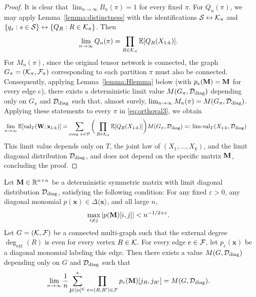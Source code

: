 \documentclass[10pt,reqno]{amsart}
\def\x{\mathbf{x}}
\def\E{\mathbb{E}}
\def\R{\mathbb{R}}
\def\val{\operatorname{val}}
\def\limval{\operatorname{lim-val}}
\def\bW{{\mathbf{W}}}
\def\eps{\varepsilon}
\newcommand{\degext}{\deg_\mathrm{ext}}
\newcommand{\tdiag}{\mathrm{diag}}
\begin{document}
\begin{proof}
It is clear that $\lim_{n \to \infty} B_n(\pi)=1$ for every fixed $\pi$.
For $Q_n(\pi)$, we may apply Lemma~\ref{lemma:distinctness} with the 
identifications ${\mathcal{S}} \leftrightarrow \mathcal{K}_\pi$
and $\{q_s:s \in {\mathcal{S}}\} \leftrightarrow \{Q_R:R \in \mathcal{K}_\pi\}$. Then
\[\lim_{n \to \infty} Q_n(\pi)=\prod_{R \in \mathcal{K}_\pi} \mathbb{E}[Q_R(X_{1:k})].\]
For $M_n(\pi)$, since the original tensor network is connected, the graph
$G_\pi=(\mathcal{K}_\pi,\mathcal{F}_\pi)$ corresponding to each partition $\pi$
must also be connected.
Consequently, applying Lemma~\ref{lemma:Hlemma} below (with $p_e(\mathbf{M})=\mathbf{M}$ for
every edge $e$), there exists a 
deterministic limit value $M(G_\pi,\cD_\tdiag)$ depending only on $G_\pi$ and 
$\cD_\tdiag$ such that, almost surely,
$\lim_{n \to \infty} M_n(\pi)=M(G_\pi,\cD_\tdiag)$.
Applying these statements to
every $\pi$ in \eqref{eq:orthoval3}, we obtain 
\begin{align*}
	\lim_{n\to\infty}\E[\val_T(\bW;\x_{1:k})] &= 
	\sum_{\text{even } \pi \in \cP}
\bigg(\prod_{R \in \cK_\pi} \EE[Q_R(X_{1:k})]\bigg)M(G_\pi, \cD_\tdiag)
=:\limval_T(X_{1:k},\cD_\tdiag)
\end{align*}
This limit value depends only on $T$, the joint law of $(X_1,\ldots,X_k)$, and
the limit diagonal distribution $\cD_\tdiag$, and does not depend on the specific 
matrix $\mathbf{M}$, concluding the proof.
\end{proof}

\begin{lemma}\label{lemma:Hlemma}
Let $\Mb \in \R^{n \times n}$ be a deterministic symmetric matrix with 
limit diagonal distribution $\cD_\tdiag$, satisfying the following
condition: For any fixed $\eps>0$, any diagonal monomial
$p(\x) \in \Delta\langle \x \rangle$, and all large $n$,
\[\max_{i\neq j} |p(\bM)[i,j]|<n^{-1/2+\eps}.\]
Let $G=(\mathcal{K},\mathcal{F})$ be a connected multi-graph such that the external degree
$\degext(R)$ is even for every vertex $R\in\mathcal{K}$.
For every edge $e\in\mathcal{F}$, let $p_e(\x)$ be a diagonal monomial labeling this edge.
Then there exists a value $M(G,\cD_\tdiag)$ depending only on
$G$ and $\cD_\tdiag$ such that
\[\lim_{n \to \infty} \frac{1}{n}
\sum_{\bj\in[n]^{\cK}}^* \prod_{e=(R,R')\in\cF} p_e(\bM)[j_R, j_{R'}]
= M(G,\cD_\tdiag).\]
\end{lemma}
\end{document}
